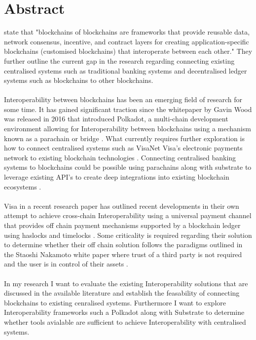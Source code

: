 \documentclass[12pt]{article}
\begin{document}
\section{Abstract}
\autocite{belchiorSurveyBlockchainInteroperability2021}
state that "blockchains of blockchains are frameworks that provide reusable data, network consensus, incentive, 
and contract layers for creating application-specific blockchains (customised blockchains) that interoperate between each other."
They further outline the current gap in the research regarding connecting existing centralised systems such as traditional banking
systems and decentralised ledger systems such as blockchains to other blockchains.
\\\\
Interoperability between blockchains has been an emerging field of
research for some time. It has gained significant traction since the whitepaper by Gavin Wood was released in 2016 that introduced Polkadot, 
a multi-chain development environment allowing for Interoperability between blockchains using a mechanism known as a parachain or bridge \autocite{woodPOLKADOTVISIONHETEROGENEOUS2016}.
What currently requires further exploration is how to connect centralised systems such as VisaNet Visa's electronic payments network to existing blockchain technologies \autocite{VisaNetTechnologyVisa}.
Connecting centralised banking systems to blockchains could be possible using parachains along with substrate to leverage existing API's to create deep integrations into existing blockchain ecosystems \autocite{polkadotPolkadotDecoded20202021}.
\\\\ 
Visa in a recent research paper has outlined recent developments in their own attempt to achieve cross-chain Interoperability using a universal payment channel that provides off chain payment mechanisms 
supported by a blockchain ledger using haslocks and timelocks \autocite{christodorescuUniversalPaymentChannels2021}. Some criticality is required regarding their solution to determine whether their off chain solution follows the paradigms
outlined in the Staoshi Nakamoto white paper where trust of a third party is not required and the user is in control of their assets \autocite{nakamotoBitcoinPeertoPeerElectronic}.
\\\\
In my research I want to evaluate the existing Interoperability solutions that are discussed in the available literature and establish the feasability of connecting blockchains to existing cenralised systems.
Furthermore I want to explore Interoperability frameworks such a Polkadot along with Substrate to determine whether tools avialable are sufficient to achieve Interoperability with centralised systems.
\end{document}
